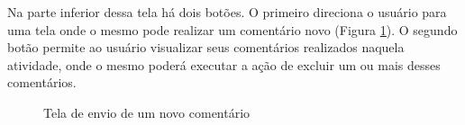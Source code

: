 Na parte inferior dessa tela há dois botões. O primeiro direciona o usuário para uma tela onde o mesmo pode realizar um comentário novo (Figura \ref{fig:audiencia13}). O segundo botão permite ao usuário visualizar seus comentários realizados naquela atividade, onde o mesmo poderá executar a ação de excluir um ou mais desses comentários.

\begin{figure}[H]
    \centering
    \caption{Tela de envio de um novo comentário}
    \label{fig:audiencia13}
\end{figure}

